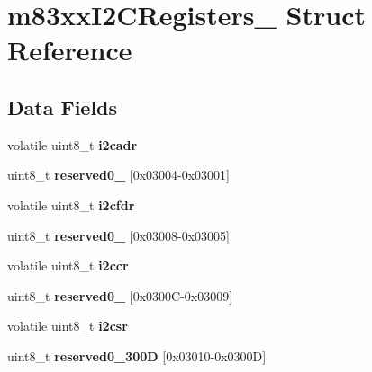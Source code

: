 \hypertarget{structm83xxI2CRegisters__}{}\section{m83xx\+I2\+C\+Registers\+\_\+ Struct Reference}
\label{structm83xxI2CRegisters__}
\subsection*{Data Fields}
\begin{DoxyCompactItemize}
\item 
\mbox{\label{structm83xxI2CRegisters___ac10c301867b4e3b81fdb12399e6535f3}} 
volatile uint8\+\_\+t {\bfseries i2cadr}
\item 
\mbox{\label{structm83xxI2CRegisters___a66f8573b68cec0150effeb5681354b92}} 
uint8\+\_\+t {\bfseries reserved0\+\_} \mbox{[}0x03004-\/0x03001\mbox{]}
\item 
\mbox{\label{structm83xxI2CRegisters___a35cdb76e067967f7cf08f19f66ac5b7a}} 
volatile uint8\+\_\+t {\bfseries i2cfdr}
\item 
\mbox{\label{structm83xxI2CRegisters___ae3db78f0fdf5b9ffeb992b75cc610e0e}} 
uint8\+\_\+t {\bfseries reserved0\+\_} \mbox{[}0x03008-\/0x03005\mbox{]}
\item 
\mbox{\label{structm83xxI2CRegisters___a3f136822ec4b1f0ac1edc4603ab97821}} 
volatile uint8\+\_\+t {\bfseries i2ccr}
\item 
\mbox{\label{structm83xxI2CRegisters___a173474399e9dee9297562460aac1c508}} 
uint8\+\_\+t {\bfseries reserved0\+\_} \mbox{[}0x0300\+C-\/0x03009\mbox{]}
\item 
\mbox{\label{structm83xxI2CRegisters___a28e1cee8e1deb4215eed9731af599513}} 
volatile uint8\+\_\+t {\bfseries i2csr}
\item 
\mbox{\label{structm83xxI2CRegisters___a8498f414dc706eb68d966f998d486d88}} 
uint8\+\_\+t {\bfseries reserved0\+\_\+300D} \mbox{[}0x03010-\/0x0300\+D\mbox{]}

\end{DoxyCompactItemize}
